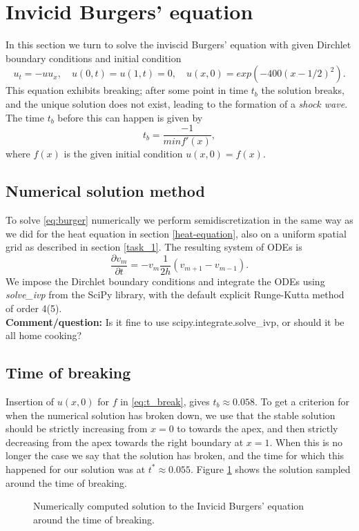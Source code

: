 \section{Invicid Burgers' equation}

In this section we turn to solve the inviscid Burgers' equation with given Dirchlet boundary conditions and initial condition
\begin{equation}
    u_t = -uu_x, \quad u(0, t) = u(1, t) = 0, \quad u(x, 0) = exp(-400(x-1/2)^2).
    \label{eq:burger}
\end{equation}
This equation exhibits breaking; 
after some point in time $t_b$ the solution breaks, 
and the unique solution does not exist, 
leading to the formation of a \textit{shock wave}.\cite{burgers} 
The time $t_b$ before this can happen is given by
\begin{equation}
    t_b = \frac{-1}{min f'(x)}, 
    \label{eq:t_break}
\end{equation}
where $f(x)$ is the given initial condition $u(x, 0) = f(x)$.\cite{burgers} 

\subsection*{Numerical solution method}
To solve \eqref{eq:burger} numerically we perform semidiscretization in the same way as we did for the heat equation in section \ref{heat-equation}, 
also on a uniform spatial grid as described in section \ref{task_1}. 
The resulting system of ODEs is
\begin{equation*}
    \frac{\partial v_m}{\partial t} = -v_m \frac{1}{2h} (v_{m+1} - v_{m-1}). 
\end{equation*}
We impose the Dirchlet boundary conditions and integrate the ODEs using \textit{solve\_ivp} from the SciPy library, 
with the default explicit Runge-Kutta method of order 4(5)\cite{solve_ivp}. \\
\textbf{Comment/question:} Is it fine to use scipy.integrate.solve\_ivp, 
or should it be all home cooking? 

\subsection{Time of breaking}
Insertion of $u(x, 0)$ for $f$ in \eqref{eq:t_break}, 
gives $t_b \approx 0.058$. 
To get a criterion for when the numerical solution has broken down, 
we use that the stable solution should be strictly increasing from $x=0$ to towards the apex, 
and then strictly decreasing from the apex towards the right boundary at $x=1$. 
When this is no longer the case we say that the solution has broken, 
and the time for which this happened for our solution was at $t^* \approx 0.055$. 
Figure \ref{fig:burgers-samples} shows the solution sampled around the time of breaking. 

\begin{figure}[ht]
    \centering
    
    \caption{Numerically computed solution to the Invicid Burgers' equation around the time of breaking.}
    \label{fig:burgers-samples}
\end{figure}

